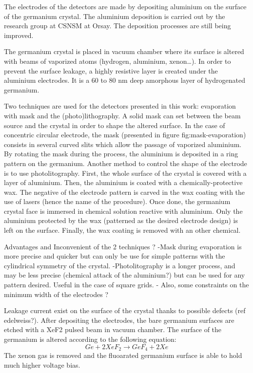 The electrodes of the detectors are made by depositing aluminium on the surface of the germanium crystal. The aluminium deposition is carried out by the research group at CSNSM at Orsay. The deposition processes are still being improved.

The germanium crystal is placed in vacuum chamber where its surface is altered with beams of vaporized atoms (hydrogen, aluminium, xenon…). 
In order to prevent the surface leakage, a highly resistive layer is created under the aluminium electrodes. It is a 60 to 80 nm deep amorphous layer of hydrogenated germanium.

Two techniques are used for the detectors presented in this work: evaporation with mask and the (photo)lithography.
A solid mask can set between the beam source and the crystal in order to shape the altered surface. In the case of concentric circular electrode, the mask (presented in figure {fig:mask-evaporation}) consists in several curved slits which allow the passage of vaporized aluminium. By rotating the mask during the process, the aluminium is deposited in a ring pattern on the germanium.
Another method to control the shape of the electrode is to use photolitography. First, the whole surface of the crystal is covered with a layer of aluminium. Then, the aluminium is coated with a chemically-protective wax. The negative of the electrode pattern is carved in the wax coating with the use of lasers (hence the name of the procedure). Once done, the germanium crystal face is immersed in chemical solution reactive with aluminium. Only the aluminium protected by the wax (patterned as the desired electrode design) is left on the surface. Finally, the wax coating is removed with an other chemical.

Advantages and Inconvenient of the 2 techniques ?
-Mask during evaporation is more precise and quicker but can only be use for simple patterns  with the cylindrical symmetry of the crystal.
-Photolitography is a longer process, and may be less precise (chemical attack of the aluminium?) but can be used for any pattern desired. Useful in the case of square grids.
- Also, some constraints on the minimum width of the electrodes ?

Leakage current exist on the surface of the crystal thanks to possible defects (ref edelweiss?). After depositing the electrodes, the bare germanium surfaces are etched with a XeF2 pulsed beam in vacuum chamber. The surface of the germanium is altered according to the following equation:
$$Ge + 2XeF_2 \longrightarrow GeF_4 + 2Xe$$
The xenon gas is removed and the fluoarated germanium surface is able to hold much higher voltage bias.

